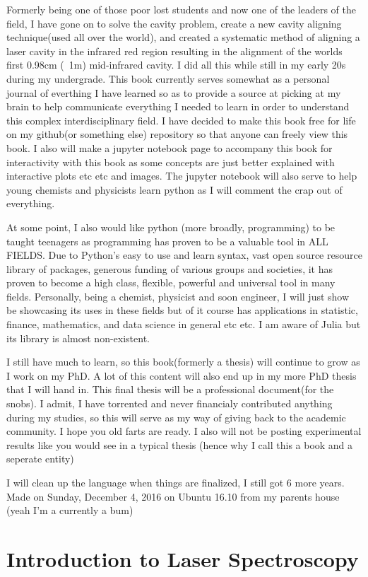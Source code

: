 \documentclass[a4paper]{book}
\begin{document}
		Formerly being one of those poor lost students and now one of the leaders of the field, I have gone on to solve the cavity problem, create a new cavity aligning technique(used all over the world), and created a systematic method of aligning a laser cavity in the infrared red region resulting in the alignment of the worlds first 0.98cm (~1m) mid-infrared cavity. I did all this while still in my early 20s during my undergrade. This book currently serves somewhat as a personal journal of everthing I have learned so as to provide a source at picking at my brain to help communicate everything I needed to learn in order to understand this complex interdisciplinary field. I have decided to make this book free for life on my github(or something else) repository so that anyone can freely view this book. I also will make a jupyter notebook page to accompany this book for interactivity with this book as some concepts are just better explained with interactive plots etc etc and images. The jupyter notebook will also serve to help young chemists and physicists learn python as I will comment the crap out of everything.
		
		At some point, I also would like python (more broadly, programming) to be taught teenagers as programming has proven to be a valuable tool in ALL FIELDS. Due to Python's easy to use and learn syntax, vast open source resource library of packages,  generous funding of various groups and societies, it has proven to become a high class, flexible, powerful and universal tool in many fields. Personally, being a chemist, physicist and soon engineer, I will just show be showcasing its uses in these fields but of it course has applications in statistic, finance, mathematics, and data science in general etc etc. I am aware of Julia but its library is almost non-existent.
		
		I still have much to learn, so this book(formerly a thesis) will continue to grow as I work on my PhD. A lot of this content will also end up in my more PhD thesis that I will hand in. This final thesis will be a professional document(for the snobs). I admit, I have torrented and never financialy contributed anything during my studies, so this will serve as my way of giving back to the academic community. I hope you old farts are ready. I also will not be posting experimental results like you would see in a typical thesis (hence why I call this a book and a seperate entity)

		I will clean up the language when things are finalized, I still got 6 more years. Made on Sunday, December 4, 2016 on Ubuntu 16.10 from my parents house (yeah I'm a currently a bum)
		
		\mainmatter
		
	\chapter{Introduction to Laser Spectroscopy}
	
\end{document}

